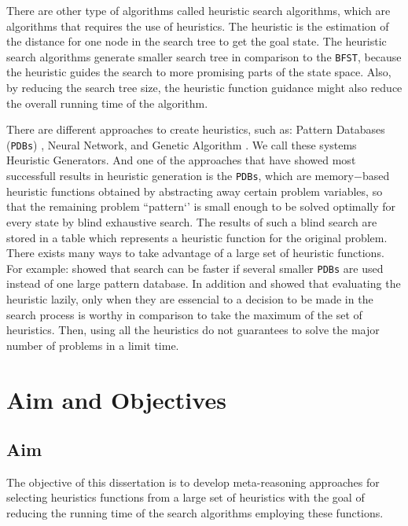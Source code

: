 There are other type of algorithms called heuristic search algorithms, which are algorithms that requires the use of heuristics. The heuristic is the estimation of the distance for one node in the search tree to get the goal state. The heuristic search algorithms generate smaller search tree in comparison to the \texttt{BFST}, because the heuristic guides the search to more promising parts of the state space. Also, by reducing the search tree size, the heuristic function guidance might also reduce the overall running time of the algorithm.

There are different approaches to create heuristics, such as: Pattern Databases (\texttt{PDBs}) \cite{haslum2007domain}, Neural Network, and Genetic Algorithm \cite{edelkamp2007automated}. We call these systems Heuristic Generators. And one of the approaches that have showed most successfull results in heuristic generation is the \texttt{PDBs}, which are memory$-$based heuristic functions obtained by abstracting away certain problem variables, so that the remaining problem ``pattern‘’ is small enough to be solved optimally for every state by blind exhaustive search. The results of such a blind search are stored in a table which represents a heuristic function for the original problem.\\

There exists many ways to take advantage of a large set of heuristic functions. For example: \cite{holte2006maximizing} showed that search can be faster if several smaller \texttt{PDBs} are used instead of one large pattern database. In addition \cite{domshlak2010max} and \cite{tolpin2013towards} showed that evaluating the heuristic lazily, only when they are essencial to a decision to be made in the search process is worthy in comparison to take the maximum of the set of heuristics. Then, using all the heuristics do not guarantees to solve the major number of problems in a limit time.
\section{Aim and Objectives}
\subsection{Aim}
\noindent
The objective of this dissertation is to develop meta-reasoning approaches for selecting heuristics functions from a large set of heuristics with the goal of reducing the running time of the search algorithms employing these functions.


